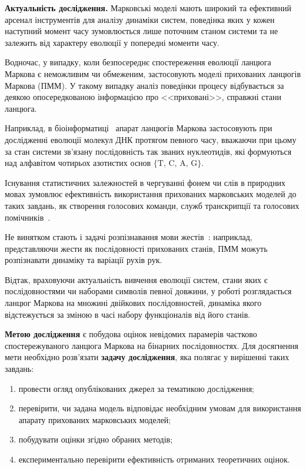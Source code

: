 \textbf{Актуальність дослідження.} Марковські моделі мають широкий та ефективний арсенал інструментів для аналізу динаміки систем, поведінка яких у кожен наступний момент часу зумовлюється лише поточним станом системи та не залежить від характеру еволюції у попередні моменти часу. 

Водночас, у випадку, коли безпосереднє спостереження еволюції ланцюга Маркова є неможливим чи обмеженим, застосовують моделі прихованих ланцюгів Маркова (ПММ). У такому випадку аналіз поведінки процесу відбувається за деякою опосередкованою інформацією про <<приховані>>, справжні стани ланцюга. 

Наприклад, в біоінформатиці~\cite[глава 9]{Koski2001} апарат ланцюгів Маркова застосовують при дослідженні еволюції молекул ДНК протягом певного часу, вважаючи при цьому за стан системи зв'язану послідовність так званих нуклеотидів, які формуються над алфавітом чотирьох азотистих основ $\{\text{T, C, A, G} \}$.  

Існування статистичних залежностей в чергуванні фонем чи слів в природних мовах зумовлює ефективність використання прихованих марковських моделей до таких завдань, як створення голосових команди, служб транскрипції та голосових помічників~\cite{Rabiner1989}.

Не винятком стають і задачі розпізнавання мови жестів~\cite{Chaaraoui2013}: наприклад, представляючи жести як послідовності прихованих станів, ПММ можуть розпізнавати динаміку та варіації рухів рук.

Відтак, враховуючи актуальність вивчення еволюції систем, стани яких є послідовностями чи наборами символів певної довжини, у роботі розглядається ланцюг Маркова на множині двійкових послідовностей, динаміка якого відстежується за зміною в часі набору функціоналів від його станів.

\textbf{Метою дослідження} є побудова оцінок невідомих парамерів частково спостережуваного ланцюга Маркова на бінарних послідовностях. Для досягнення мети необхідно розв'язати \textbf{задачу дослідження}, яка полягає у вирішенні таких завдань:

\begin{enumerate}
\item провести огляд опублікованих джерел за тематикою дослідження;
\item перевірити, чи задана модель відповідає необхідним умовам для використання апарату прихованих марковських моделей;
\item побудувати оцінки згідно обраних методів;
\item експериментально перевірити ефективність отриманих теоретичних оцінок.
\end{enumerate}

